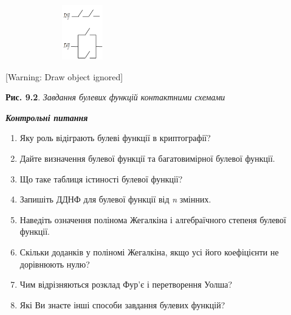 \bigskip



\begin{figure}
\centering
\begin{minipage}{2.4217in}
{\centering 
\includegraphics[width=1.802in,height=0.9374in]{crypt-img/crypt-img168.png}
\par}
\end{minipage}
\end{figure}

\bigskip


\bigskip


\bigskip


\bigskip

[Warning: Draw object ignored]

{\centering
\textbf{Рис. 9.2}. \textit{Завдання булевих функцій контактними схемами}
\par}


\bigskip


\bigskip

{\centering\bfseries\itshape
Контрольні питання 
\par}


\bigskip


\bigskip

\liststyleWWviiiNumlvii
\begin{enumerate}
\item Яку роль\textbf{ }відіграють булеві функції в криптографії?
\item Дайте визначення булевої функції та багатовимірної булевої функції.
\item Що таке таблиця істиності булевої функції?
\item Запишіть ДДНФ для булевої функції від \textit{n} змінних.
\item Наведіть означення полінома Жегалкіна і алгебраїчного
с\textcolor[rgb]{0.0,0.5019608,0.0}{тепеня}  булевої функції.
\item Скільки доданків у поліномі Жегалкіна, якщо усі його коефіцієнти не
дорівнюють нулю?
\item Чим відрізняються розклад Фур’є і перетворення Уолша?
\item Які Ви знаєте інші способи завдання булевих функцій?
\end{enumerate}

